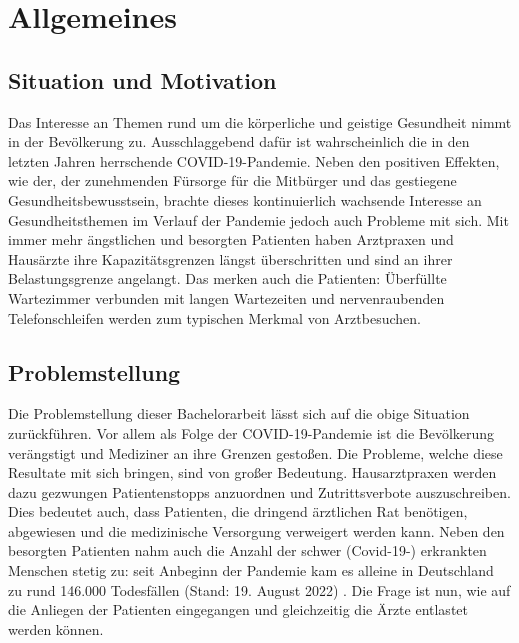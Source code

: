 
\chapter{Allgemeines}

\section{Situation und Motivation}
Das Interesse an Themen rund um die körperliche und geistige Gesundheit nimmt in der Bevölkerung zu. Ausschlaggebend dafür ist wahrscheinlich die in den letzten Jahren herrschende  COVID-19-Pandemie. \cite{.bahn-bonn}
Neben den positiven Effekten, wie der, der zunehmenden Fürsorge für die Mitbürger \cite{.bahn-bonn}  und das gestiegene Gesundheitsbewusstsein, brachte dieses kontinuierlich wachsende Interesse an Gesundheitsthemen im Verlauf der Pandemie jedoch auch Probleme mit sich. Mit immer mehr ängstlichen und besorgten Patienten haben Arztpraxen und Hausärzte ihre Kapazitätsgrenzen längst überschritten und sind an ihrer Belastungsgrenze angelangt. \cite{.sok}
Das merken auch die Patienten: Überfüllte Wartezimmer verbunden mit langen Wartezeiten und nervenraubenden Telefonschleifen werden zum typischen Merkmal von Arztbesuchen.
 

\section{Problemstellung}
Die Problemstellung dieser Bachelorarbeit lässt sich auf die obige Situation zurückführen. Vor allem als Folge der COVID-19-Pandemie ist die Bevölkerung verängstigt und Mediziner an ihre Grenzen gestoßen.
Die Probleme, welche diese Resultate mit sich bringen, sind von großer Bedeutung. Hausarztpraxen werden dazu gezwungen Patientenstopps anzuordnen und Zutrittsverbote auszuschreiben. \cite{.sok} Dies bedeutet auch, dass Patienten, die dringend ärztlichen Rat benötigen, abgewiesen und die medizinische Versorgung verweigert werden kann. Neben den besorgten Patienten nahm auch die Anzahl der schwer (Covid-19-) erkrankten Menschen stetig zu: seit Anbeginn der Pandemie  kam es alleine in Deutschland zu rund 146.000 Todesfällen (Stand: 19. August 2022) \cite{.rki}. 
Die Frage ist nun, wie auf die Anliegen der Patienten eingegangen und gleichzeitig die Ärzte entlastet werden können.

